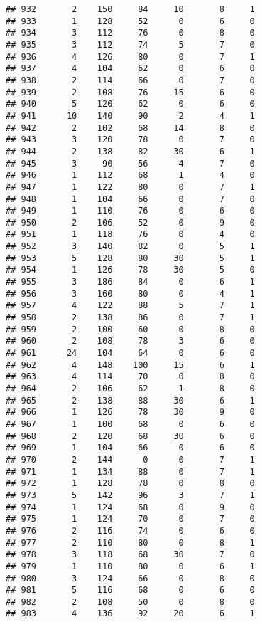 \documentclass[
]{article}
\begin{document}
\begin{verbatim}
## 932       2    150     84     10       8     1
## 933       1    128     52      0       6     0
## 934       3    112     76      0       8     0
## 935       3    112     74      5       7     0
## 936       4    126     80      0       7     1
## 937       4    104     62      0       6     0
## 938       2    114     66      0       7     0
## 939       2    108     76     15       6     0
## 940       5    120     62      0       6     0
## 941      10    140     90      2       4     1
## 942       2    102     68     14       8     0
## 943       3    120     78      0       7     0
## 944       2    138     82     30       6     1
## 945       3     90     56      4       7     0
## 946       1    112     68      1       4     0
## 947       1    122     80      0       7     1
## 948       1    104     66      0       7     0
## 949       1    110     76      0       6     0
## 950       2    106     52      0       9     0
## 951       1    118     76      0       4     0
## 952       3    140     82      0       5     1
## 953       5    128     80     30       5     1
## 954       1    126     78     30       5     0
## 955       3    186     84      0       6     1
## 956       3    160     80      0       4     1
## 957       4    122     88      5       7     1
## 958       2    138     86      0       7     1
## 959       2    100     60      0       8     0
## 960       2    108     78      3       6     0
## 961      24    104     64      0       6     0
## 962       4    148    100     15       6     1
## 963       4    114     70      0       8     0
## 964       2    106     62      1       8     0
## 965       2    138     88     30       6     1
## 966       1    126     78     30       9     0
## 967       1    100     68      0       6     0
## 968       2    120     68     30       6     0
## 969       1    104     66      0       6     0
## 970       2    144      0      0       7     1
## 971       1    134     88      0       7     1
## 972       1    128     78      0       8     0
## 973       5    142     96      3       7     1
## 974       1    124     68      0       9     0
## 975       1    124     70      0       7     0
## 976       2    116     74      0       6     0
## 977       2    110     80      0       8     1
## 978       3    118     68     30       7     0
## 979       1    110     80      0       6     1
## 980       3    124     66      0       8     0
## 981       5    116     68      0       6     0
## 982       2    108     50      0       8     0
## 983       4    136     92     20       6     1

\end{verbatim}
\end{document}
